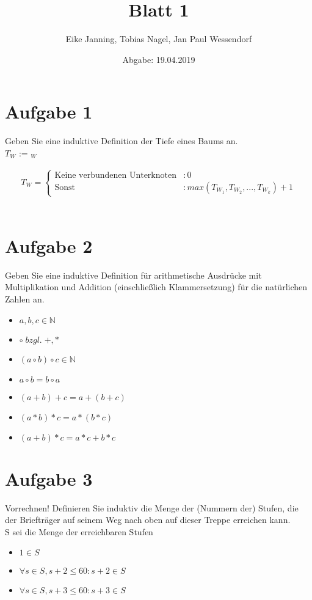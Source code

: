 \documentclass[paper = a4, ngerman]{scrartcl}
\title{Blatt 1}
\author{Eike Janning, Tobias Nagel, Jan Paul Wessendorf}
\date{Abgabe: 19.04.2019}
\begin{document}
\maketitle
\hrulefill

\section*{Aufgabe 1}

Geben Sie eine induktive Definition der Tiefe eines Baums an.\\
$T_W$ :=  $_W$

	\begin{align*}
		T_W =
		\begin{cases}
			\text{Keine verbundenen Unterknoten} &: 0\\
			\text{Sonst} &: max(T_{W_1}, T_{W_2}, ..., T_{W_k}) + 1
		\end{cases}
	\end{align*}\\

\section*{Aufgabe 2}
	 Geben Sie eine induktive Definition für arithmetische Ausdrücke mit Multiplikation und Addition (einschließlich Klammersetzung) für die natürlichen Zahlen an.\\
		\begin{itemize}
			\item$ a, b, c \in \mathbb{N}$
			\item$\circ \; \textit{bzgl.} \; +,*$
			\item$\left(a \circ b\right)\circ c \in  \mathbb{N}$
			\item$a \circ b = b \circ a$
			\item$\left(a + b\right) + c = a + \left(b + c\right)$
			\item$\left(a * b\right) * c = a * \left(b * c\right)$
			\item$\left(a + b\right) * c = a * c + b * c$
		\end{itemize}
	 	
\pagebreak

\section*{Aufgabe 3}
Vorrechnen! Definieren Sie induktiv die Menge der (Nummern der) Stufen, die der Briefträger auf seinem Weg nach oben auf dieser Treppe erreichen kann.\\
S sei die Menge der erreichbaren Stufen
\begin{itemize}
	\item $1 \in S$
	\item $\forall s \in S, s+2 \le 60 : s + 2 \in S$
	\item $\forall s \in S, s+3 \le 60 : s + 3 \in S$
\end{itemize}
\end{document}
